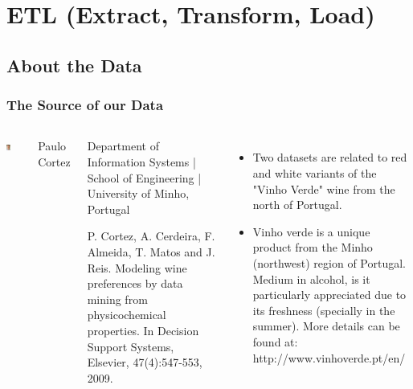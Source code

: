 \documentclass{beamer}
\begin{document}
	
	\section{ETL (Extract, Transform, Load)}
	
	\subsection{About the Data}
	
	\begin{frame}
		\frametitle{The Source of our Data}

		\begin{columns}
			

			
								\includegraphics[width=0.3\textwidth]{images/paulo cortez headshot.jpg}
								
								Paulo Cortez \par
								\begin{footnotesize}
								Department of Information Systems | School of Engineering | University of Minho, Portugal \par
									P. Cortez, A. Cerdeira, F. Almeida, T. Matos and J. Reis. Modeling wine preferences by data mining from physicochemical properties. In Decision Support Systems, Elsevier, 47(4):547-553, 2009.
								\end{footnotesize}
				
						\vspace{-15pt}
				\begin{itemize}
					\item Two datasets are related to red and white variants of the "Vinho Verde" wine from the north of Portugal.
					\item Vinho verde is a unique product from the Minho (northwest) region of Portugal. Medium in alcohol, is it particularly appreciated due to its freshness (specially in the summer). More details can be found at: http://www.vinhoverde.pt/en/ 
				\end{itemize}
		\end{columns}
	\end{frame}
\end{document}
